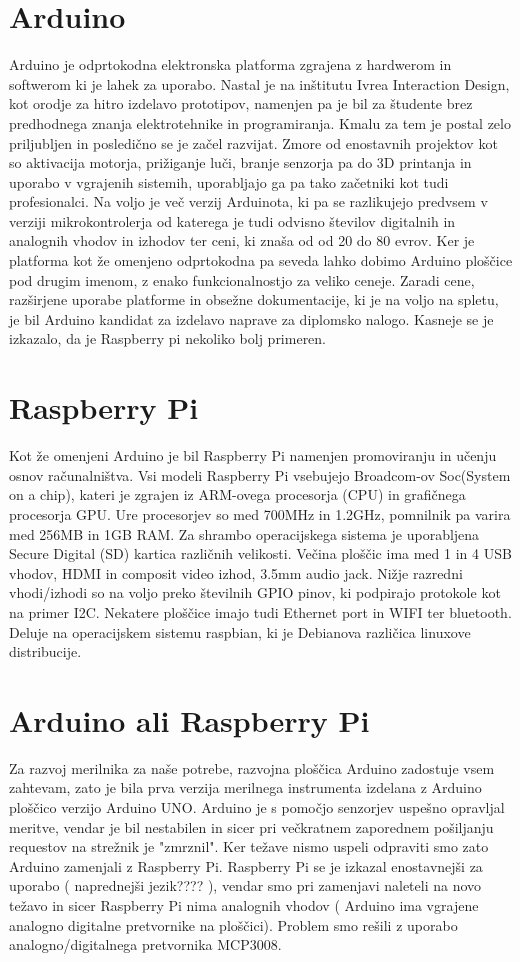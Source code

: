 \documentclass[12pt,a4paper,titlepage,openany]{report}
\begin{document}
\section{Arduino}
Arduino je odprtokodna elektronska platforma zgrajena z hardwerom in softwerom ki je lahek za uporabo. Nastal je na inštitutu Ivrea Interaction Design, kot orodje za hitro izdelavo prototipov, namenjen pa je bil za študente brez predhodnega znanja elektrotehnike in programiranja. Kmalu za tem je postal zelo priljubljen in posledično se je začel razvijat. Zmore od enostavnih projektov kot so aktivacija motorja, prižiganje luči, branje senzorja pa do 3D printanja in uporabo v vgrajenih sistemih, uporabljajo ga pa tako začetniki kot tudi profesionalci. Na voljo je več verzij Arduinota, ki pa se razlikujejo predvsem v verziji mikrokontrolerja od katerega je tudi odvisno številov digitalnih in analognih vhodov in izhodov ter ceni, ki znaša od od 20 do 80 evrov. Ker je platforma kot že omenjeno odprtokodna pa seveda lahko dobimo Arduino ploščice pod drugim imenom, z enako funkcionalnostjo za veliko ceneje. Zaradi cene, razširjene uporabe platforme in obsežne dokumentacije, ki je na voljo na spletu, je bil Arduino kandidat za izdelavo naprave za diplomsko nalogo. Kasneje se je izkazalo, da je Raspberry pi nekoliko bolj     primeren.

\section{Raspberry Pi}
Kot že omenjeni Arduino je bil Raspberry Pi namenjen promoviranju in učenju osnov računalništva. Vsi modeli Raspberry Pi vsebujejo Broadcom-ov Soc(System on a chip), kateri je zgrajen iz ARM-ovega procesorja (CPU) in grafičnega procesorja GPU. Ure procesorjev so med 700MHz in 1.2GHz, pomnilnik pa varira med 256MB in 1GB RAM. Za shrambo operacijskega sistema je uporabljena Secure Digital (SD) kartica različnih velikosti. Večina ploščic ima med 1 in 4 USB vhodov, HDMI in composit video izhod, 3.5mm audio jack. Nižje razredni vhodi/izhodi so na voljo preko številnih GPIO pinov, ki podpirajo protokole kot na primer I2C. Nekatere ploščice imajo tudi Ethernet port in WIFI ter bluetooth. Deluje na operacijskem sistemu raspbian, ki je Debianova različica linuxove distribucije.

\section{Arduino ali Raspberry Pi}
Za razvoj merilnika za naše potrebe, razvojna ploščica Arduino zadostuje vsem zahtevam, zato je bila prva verzija merilnega instrumenta izdelana z Arduino ploščico verzijo Arduino UNO. Arduino je s pomočjo senzorjev uspešno opravljal meritve, vendar je bil nestabilen in sicer pri večkratnem zaporednem pošiljanju requestov na strežnik  je "zmrznil". Ker težave nismo uspeli odpraviti smo zato Arduino zamenjali z Raspberry Pi. Raspberry Pi se je izkazal enostavnejši za uporabo ( naprednejši jezik???? ), vendar smo pri zamenjavi naleteli na novo težavo in sicer Raspberry Pi nima analognih vhodov ( Arduino ima vgrajene analogno digitalne pretvornike na ploščici). Problem smo rešili z uporabo analogno/digitalnega pretvornika MCP3008.
\end{document}
